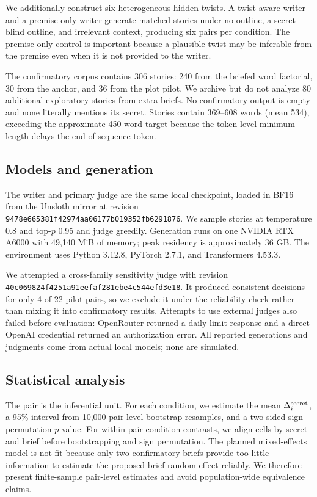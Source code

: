  We additionally construct six heterogeneous hidden twists. A twist-aware writer and a premise-only writer generate matched stories under no outline, a secret-blind outline, and irrelevant context, producing six pairs per condition. The premise-only control is important because a plausible twist may be inferable from the premise even when it is not provided to the writer.

 The confirmatory corpus contains 306 stories: 240 from the briefed word factorial, 30 from the anchor, and 36 from the plot pilot. We archive but do not analyze 80 additional exploratory stories from extra briefs. No confirmatory output is empty and none literally mentions its secret. Stories contain 369--608 words (mean 534), exceeding the approximate 450-word target because the token-level minimum length delays the end-of-sequence token.

\subsection{Models and generation}

The writer and primary judge are the same local \gemma checkpoint, loaded in BF16 from the Unsloth mirror at revision \texttt{9478e665381f42974aa06177b019352fb6291876}. We sample stories at temperature 0.8 and top-$p$ 0.95 and judge greedily. Generation runs on one NVIDIA RTX A6000 with 49,140 MiB of memory; peak residency is approximately 36 GB. The environment uses Python 3.12.8, PyTorch 2.7.1, and Transformers 4.53.3.

We attempted a cross-family sensitivity judge with \qwen revision \texttt{40c069824f4251a91eefaf281ebe4c544efd3e18}. It produced consistent decisions for only 4 of 22 pilot pairs, so we exclude it under the reliability check rather than mixing it into confirmatory results. Attempts to use external judges also failed before evaluation: OpenRouter returned a daily-limit response and a direct OpenAI credential returned an authorization error. All reported generations and judgments come from actual local models; none are simulated.

\subsection{Statistical analysis}

The pair is the inferential unit. For each condition, we estimate the mean $\Delta^{\mathrm{secret}}_i$, a 95\% interval from 10,000 pair-level bootstrap resamples, and a two-sided sign-permutation $p$-value. For within-pair condition contrasts, we align cells by secret and brief before bootstrapping and sign permutation. The planned mixed-effects model is not fit because only two confirmatory briefs provide too little information to estimate the proposed brief random effect reliably. We therefore present finite-sample pair-level estimates and avoid population-wide equivalence claims.

